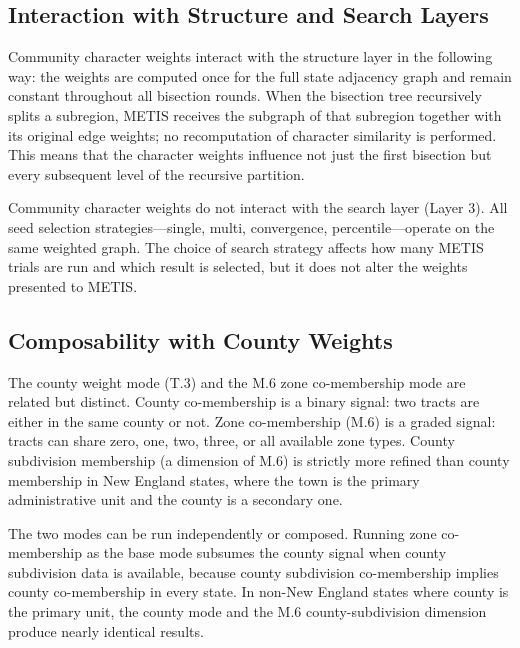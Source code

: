 \subsection{Interaction with Structure and Search Layers}

Community character weights interact with the structure layer in the following way:
the weights are computed once for the full state adjacency graph and remain constant
throughout all bisection rounds.
When the bisection tree recursively splits a subregion, METIS receives the subgraph
of that subregion together with its original edge weights; no recomputation of
character similarity is performed.
This means that the character weights influence not just the first bisection but
every subsequent level of the recursive partition.

Community character weights do not interact with the search layer (Layer 3).
All seed selection strategies---single, multi, convergence, percentile---operate on
the same weighted graph.
The choice of search strategy affects how many METIS trials are run and which result
is selected, but it does not alter the weights presented to METIS.

\subsection{Composability with County Weights}

The county weight mode (T.3) and the M.6 zone co-membership mode are related but
distinct.
County co-membership is a binary signal: two tracts are either in the same county
or not.
Zone co-membership (M.6) is a graded signal: tracts can share zero, one, two, three,
or all available zone types.
County subdivision membership (a dimension of M.6) is strictly more refined than
county membership in New England states, where the town is the primary administrative
unit and the county is a secondary one.

The two modes can be run independently or composed.
Running zone co-membership as the base mode subsumes the county signal when
county subdivision data is available, because county subdivision co-membership implies
county co-membership in every state.
In non-New England states where county is the primary unit, the county mode and the
M.6 county-subdivision dimension produce nearly identical results.
